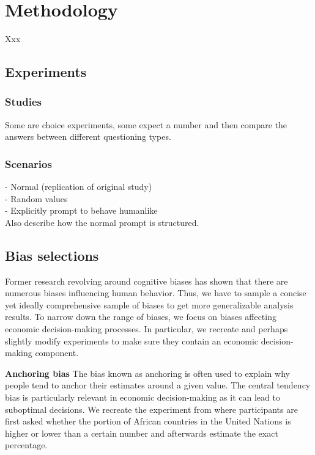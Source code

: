 \section{Methodology}
Xxx

\subsection{Experiments}
\subsubsection{Studies}
Some are choice experiments, some expect a number and then compare the answers between different questioning types.

\subsubsection{Scenarios}
- Normal (replication of original study) \\
- Random values \\
- Explicitly prompt to behave humanlike \\

Also describe how the normal prompt is structured.


\subsection{Bias selections}
\par Former research revolving around cognitive biases has shown that there are numerous biases influencing human behavior. Thus, we have to sample a concise yet ideally comprehensive sample of biases to get more generalizable analysis results. To narrow down the range of biases, we focus on biases affecting economic decision-making processes. In particular, we recreate and perhaps slightly modify experiments to make sure they contain an economic decision-making component. 

\setlength{\parindent}{20pt}
\par \textbf{Anchoring bias} The bias known as anchoring is often used to explain why people tend to anchor their estimates around a given value. The central tendency bias is particularly relevant in economic decision-making as it can lead to suboptimal decisions. We recreate the experiment from \cite{tversky1974judgment} where participants are first asked whether the portion of African countries in the United Nations is higher or lower than a certain number and afterwards estimate the exact percentage.

